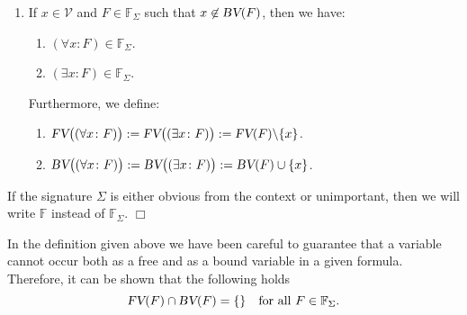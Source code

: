 \begin{Definition}
{\begin{enumerate}
\begin{enumerate}
          \item $(F \wedge G) \in \mathbb{F}_\Sigma$,
          \item $(F \vee G) \in \mathbb{F}_\Sigma$,
          \item $(F \rightarrow G) \in \mathbb{F}_\Sigma$,
          \item $(F \leftrightarrow G) \in \mathbb{F}_\Sigma$.
          \end{enumerate}
          Furthermore, for all sentential connectives  $\odot \in \{ \wedge, \vee, \rightarrow,
          \leftrightarrow \}$ we define:
          \begin{enumerate}
          \item $\FV\bigl(F \odot G \bigr) := \FV(F) \cup \FV(G)$.
          \item $\BV\bigl( F \odot G \bigr) := \BV(F) \cup \BV(G)$.
          \end{enumerate}
    \item If $x \in \mathcal{V}$  and $F \in \mathbb{F}_\Sigma$ such that $x \not\in \textsl{BV}(F)$, then
          we have:
          \begin{enumerate}
          \item $(\forall x \colon F) \in \mathbb{F}_\Sigma$.
          \item $(\exists x \colon F) \in \mathbb{F}_\Sigma$.
          \end{enumerate}
          Furthermore, we define: 
          \begin{enumerate}
          \item $\textsl{FV}\bigl( (\forall x \colon F) \bigr) := \textsl{FV}\bigl( (\exists x \colon F) \bigr) := \textsl{FV}(F) \backslash \{x\}$.
          \item $\textsl{BV}\bigl( (\forall x \colon F) \bigr) := \textsl{BV}\bigl( (\exists x \colon F) \bigr) := \textsl{BV}(F) \cup \{x\}$.  
          \end{enumerate}
    \end{enumerate}
    If the signature  $\Sigma$ is either obvious from the context or unimportant, then we will write
    $\mathbb{F}$ instead of $\mathbb{F}_\Sigma$.
    \hspace*{\fill} $\Box$
}
\end{Definition}

In the definition given above we have been careful to guarantee that a variable cannot occur both as
a free and as a bound variable in a given formula.  Therefore, it can be shown that the following
holds 
\[ \textsl{FV}(F) \cap \textsl{BV}(F) = \{\} \quad \mbox{for all $F \in \mathbb{F}_\Sigma$.} \]


